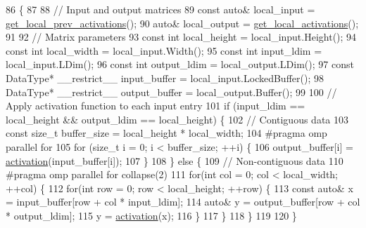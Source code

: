 \begin{DoxyCode}
86                                 \{
87 
88     \textcolor{comment}{// Input and output matrices}
89     \textcolor{keyword}{const} \textcolor{keyword}{auto}& local\_input = \hyperlink{classlbann_1_1Layer_a35397843bb0c84030000c7d872229acb}{get\_local\_prev\_activations}();
90     \textcolor{keyword}{auto}& local\_output = \hyperlink{classlbann_1_1Layer_a4248f27acebf72b7b7b3ee39c8bcb62a}{get\_local\_activations}();
91 
92     \textcolor{comment}{// Matrix parameters}
93     \textcolor{keyword}{const} \textcolor{keywordtype}{int} local\_height = local\_input.Height();
94     \textcolor{keyword}{const} \textcolor{keywordtype}{int} local\_width = local\_input.Width();
95     \textcolor{keyword}{const} \textcolor{keywordtype}{int} input\_ldim = local\_input.LDim();
96     \textcolor{keyword}{const} \textcolor{keywordtype}{int} output\_ldim = local\_output.LDim();
97     \textcolor{keyword}{const} DataType* \_\_restrict\_\_ input\_buffer = local\_input.LockedBuffer();
98     DataType* \_\_restrict\_\_ output\_buffer = local\_output.Buffer();
99 
100     \textcolor{comment}{// Apply activation function to each input entry}
101     \textcolor{keywordflow}{if} (input\_ldim == local\_height && output\_ldim == local\_height) \{
102       \textcolor{comment}{// Contiguous data}
103       \textcolor{keyword}{const} \textcolor{keywordtype}{size\_t} buffer\_size = local\_height * local\_width;
104 \textcolor{preprocessor}{      #pragma omp parallel for}
105       \textcolor{keywordflow}{for} (\textcolor{keywordtype}{size\_t} i = 0; i < buffer\_size; ++i) \{
106         output\_buffer[i] = \hyperlink{classlbann_1_1entrywise__activation__layer_a69269401530a2112b66660383464bab9}{activation}(input\_buffer[i]);
107       \}
108     \} \textcolor{keywordflow}{else} \{
109       \textcolor{comment}{// Non-contiguous data}
110 \textcolor{preprocessor}{      #pragma omp parallel for collapse(2)}
111       \textcolor{keywordflow}{for}(\textcolor{keywordtype}{int} col = 0; col < local\_width; ++col) \{
112         \textcolor{keywordflow}{for}(\textcolor{keywordtype}{int} row = 0; row < local\_height; ++row) \{
113           \textcolor{keyword}{const} \textcolor{keyword}{auto}& x = input\_buffer[row + col * input\_ldim];
114           \textcolor{keyword}{auto}& y = output\_buffer[row + col * output\_ldim];
115           y = \hyperlink{classlbann_1_1entrywise__activation__layer_a69269401530a2112b66660383464bab9}{activation}(x);
116         \}
117       \}
118     \}
119 
120   \}
\end{DoxyCode}
